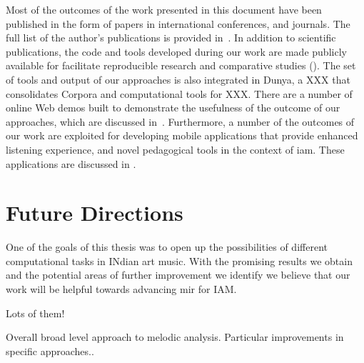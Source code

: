 Most of the outcomes of the work presented in this document have been published in the form of papers in international conferences, and journals. The full list of the author’s publications is provided in~. In addition to scientific publications, the code and tools developed during our work are made publicly available for facilitate reproducible research and comparative studies (). The set of tools and output of our approaches is also integrated in Dunya, a XXX that consolidates Corpora and computational tools for XXX. There are a number of online Web demos built to demonstrate the usefulness of the outcome of our approaches, which are discussed in~\secref{}. Furthermore, a number of the outcomes of our work are exploited for developing mobile applications that provide enhanced listening experience, and novel pedagogical tools in the context of \gls{iam}. These applications are discussed in \secref{}.

\section{Future Directions}
\label{sec:future_directions}

One of the goals of this thesis was to open up the possibilities of different computational tasks in INdian art music. With the promising results we obtain and the potential areas of further improvement we identify we believe that our work will be helpful towards advancing mir for IAM. 


Lots of them!

Overall broad level approach to melodic analysis.
Particular improvements in specific approaches..




%
%
%
%
%
%
%
%
%
%
%
